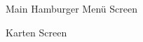 \documentclass[
    DIV12,
    cleardouble=plain,
    headings=normal,
    pdftex,
    headexclude,footexclude,
    final
]{scrreprt}
\begin{document}
\begin{figure}[ht]
	\centering
	\caption{Main Hamburger Menü Screen}
	\label{fig5}
\end{figure}



\begin{figure}[ht]
	\centering
	\caption{Karten Screen}
	\label{fig6}
\end{figure}
\end{document}
